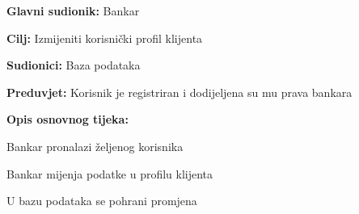 \noindent {}
\begin{packed_item}

  \item \textbf{Glavni sudionik: }Bankar
  \item  \textbf{Cilj:} Izmijeniti korisnički profil klijenta 
  \item  \textbf{Sudionici:} Baza podataka
  \item  \textbf{Preduvjet:} Korisnik je registriran i dodijeljena su mu prava bankara
  \item  \textbf{Opis osnovnog tijeka:}
  
  \item[] \begin{packed_enum}

    \item  Bankar pronalazi željenog korisnika
    \item  Bankar mijenja podatke u profilu klijenta
    \item  U bazu podataka se pohrani promjena 
  \end{packed_enum}
  
\end{packed_item}

